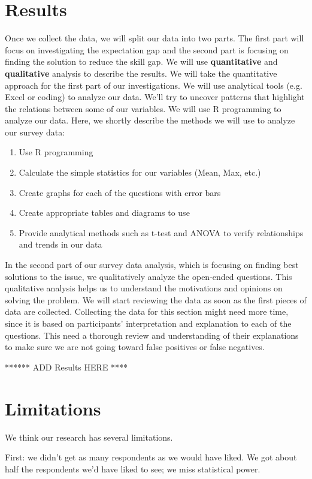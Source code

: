 \documentclass{sigchi}
\begin{document}
 \section{Results}
 Once we collect the data, we will split our data into two parts. The first part will focus on investigating the expectation gap and the second part is focusing on finding the solution to reduce the skill gap. We will use \textbf{quantitative} and \textbf{qualitative} analysis to describe the results. We will take the quantitative approach for the first part of our investigations. We will use analytical tools (e.g. Excel or coding) to analyze our data. We'll try to uncover patterns that highlight the relations between some of our variables. We will use R programming to analyze our data. Here, we shortly describe the methods we will use to analyze our survey data:
\begin{enumerate}
	\item Use R programming
	\item Calculate the simple statistics for our variables (Mean, Max, etc.)
	\item Create graphs for each of the questions with error bars
	\item Create appropriate tables and diagrams to use
	\item Provide analytical methods such as t-test and ANOVA to verify relationships and trends in our data
\end{enumerate}
 In the second part of our survey data analysis, which is focusing on finding best solutions to the issue, we qualitatively analyze the open-ended questions. This qualitative analysis helps us to understand the motivations and opinions on solving the problem. We will start reviewing the data as soon as the first pieces of data are collected. Collecting the data for this section might need more time, since it is based on participants' interpretation and explanation to each of the questions. This need a thorough review and understanding of their explanations to make sure we are not going toward false positives or false negatives.

 ****** ADD Results HERE ****
 
 
 \section{Limitations}
 We think our research has several limitations.\newline

First: we didn't get as many respondents as we would have liked. We got about half the respondents we'd have liked to see; we miss statistical power.\newline
\end{document}
